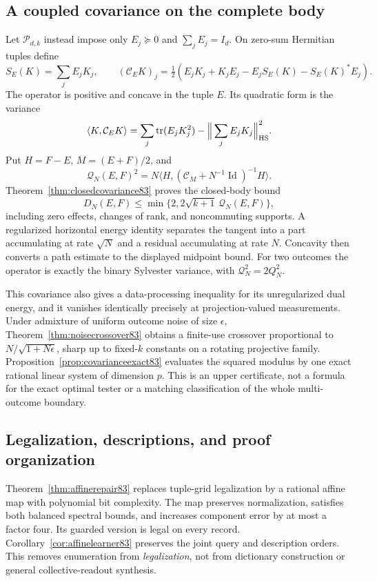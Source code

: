 \subsection{A coupled covariance on the complete body}
Let $\mathcal P_{d,k}$ instead impose only $E_j\succeq0$ and
$\sum_jE_j=I_d$.  On zero-sum Hermitian tuples define
\[
 S_E(K)=\sum_jE_jK_j,\qquad
 (\mathcal C_EK)_j=\tfrac12(E_jK_j+K_jE_j-E_jS_E(K)-S_E(K)^*E_j).
\]
The operator is positive and concave in the tuple $E$.  Its quadratic
form is the variance
\[
 \langle K,\mathcal C_EK\rangle
 =\sum_j\operatorname{tr}(E_jK_j^2)-\Big\|\sum_jE_jK_j\Big\|_{\rm HS}^2.
\]
Put $H=F-E$, $M=(E+F)/2$, and
\[
 \mathcal Q_N(E,F)^2
 =N\langle H,(\mathcal C_M+N^{-1}\operatorname{Id})^{-1}H\rangle.
\]
Theorem~\ref{thm:closedcovariance83} proves the closed-body bound
\[
 D_N(E,F)\le\min\{2,2\sqrt{k+1}\,\mathcal Q_N(E,F)\},
\]
including zero effects, changes of rank, and noncommuting supports.
A regularized horizontal energy identity separates the tangent into a
part accumulating at rate $\sqrt N$ and a residual accumulating at rate
$N$.  Concavity then converts a path estimate to the displayed midpoint
bound.  For two outcomes the operator is exactly the binary Sylvester
variance, with $\mathcal Q_N^2=2Q_N^2$.

This covariance also gives a data-processing inequality for its
unregularized dual energy, and it vanishes identically precisely at
projection-valued measurements.  Under admixture of uniform outcome
noise of size $\epsilon$, Theorem~\ref{thm:noisecrossover83} obtains a
finite-use crossover proportional to
$N/\sqrt{1+N\epsilon}$, sharp up to fixed-$k$ constants on a rotating
projective family.  Proposition~\ref{prop:covarianceexact83} evaluates
the squared modulus by one exact rational linear system of dimension
$p$.  This is an upper certificate, not a formula for the exact optimal
tester or a matching classification of the whole multi-outcome boundary.

\subsection{Legalization, descriptions, and proof organization}
Theorem~\ref{thm:affinerepair83} replaces tuple-grid legalization by a
rational affine map with polynomial bit complexity.  The map preserves
normalization, satisfies both balanced spectral bounds, and increases
component error by at most a factor four.  Its guarded version is legal
on every record.  Corollary~\ref{cor:affinelearner83} preserves the joint
query and description orders.  This removes enumeration from
\emph{legalization}, not from dictionary construction or general
collective-readout synthesis.

